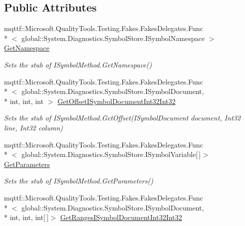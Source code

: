 \subsection*{Public Attributes}
\begin{DoxyCompactItemize}
\item 
mqttf\-::\-Microsoft.\-Quality\-Tools.\-Testing.\-Fakes.\-Fakes\-Delegates.\-Func\\*
$<$ global\-::\-System.\-Diagnostics.\-Symbol\-Store.\-I\-Symbol\-Namespace $>$ \hyperlink{class_system_1_1_diagnostics_1_1_symbol_store_1_1_fakes_1_1_stub_i_symbol_method_a273c772e9612d9b078b792a7a22698bb}{Get\-Namespace}
\begin{DoxyCompactList}\small\item\em Sets the stub of I\-Symbol\-Method.\-Get\-Namespace()\end{DoxyCompactList}\item 
mqttf\-::\-Microsoft.\-Quality\-Tools.\-Testing.\-Fakes.\-Fakes\-Delegates.\-Func\\*
$<$ global\-::\-System.\-Diagnostics.\-Symbol\-Store.\-I\-Symbol\-Document, \\*
int, int, int $>$ \hyperlink{class_system_1_1_diagnostics_1_1_symbol_store_1_1_fakes_1_1_stub_i_symbol_method_a604e4d5f2204d65e4f9f82fb4f4595e2}{Get\-Offset\-I\-Symbol\-Document\-Int32\-Int32}
\begin{DoxyCompactList}\small\item\em Sets the stub of I\-Symbol\-Method.\-Get\-Offset(\-I\-Symbol\-Document document, Int32 line, Int32 column)\end{DoxyCompactList}\item 
mqttf\-::\-Microsoft.\-Quality\-Tools.\-Testing.\-Fakes.\-Fakes\-Delegates.\-Func\\*
$<$ global\-::\-System.\-Diagnostics.\-Symbol\-Store.\-I\-Symbol\-Variable\mbox{[}$\,$\mbox{]}$>$ \hyperlink{class_system_1_1_diagnostics_1_1_symbol_store_1_1_fakes_1_1_stub_i_symbol_method_a56970218c2564e1c4d81ed5857138d8f}{Get\-Parameters}
\begin{DoxyCompactList}\small\item\em Sets the stub of I\-Symbol\-Method.\-Get\-Parameters()\end{DoxyCompactList}\item 
mqttf\-::\-Microsoft.\-Quality\-Tools.\-Testing.\-Fakes.\-Fakes\-Delegates.\-Func\\*
$<$ global\-::\-System.\-Diagnostics.\-Symbol\-Store.\-I\-Symbol\-Document, \\*
int, int, int\mbox{[}$\,$\mbox{]}$>$ \hyperlink{class_system_1_1_diagnostics_1_1_symbol_store_1_1_fakes_1_1_stub_i_symbol_method_a6f035ca37cfb1e055d3d374e76e77eb7}{Get\-Ranges\-I\-Symbol\-Document\-Int32\-Int32}

\end{DoxyCompactItemize}
